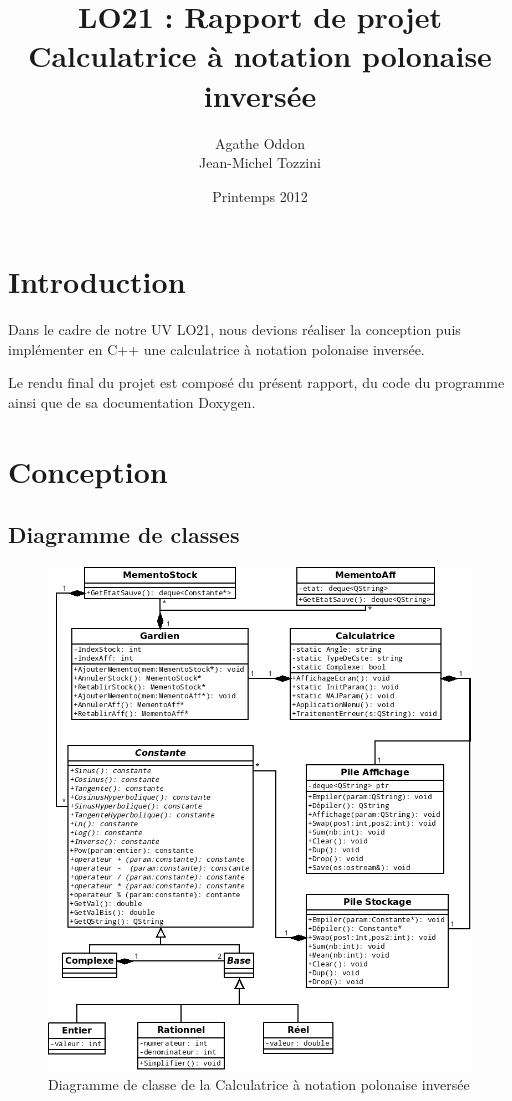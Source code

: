 \documentclass[a4paper,11pt]{article}
\begin{document}
\title{LO21 : Rapport de projet\\Calculatrice à notation polonaise inversée}
\author{Agathe Oddon\\Jean-Michel Tozzini}
\date{Printemps 2012}

\maketitle

\section*{Introduction}
Dans le cadre de notre UV LO21, nous devions réaliser la conception puis implémenter en C++ une calculatrice à notation polonaise inversée.

Le rendu final du projet est composé du présent rapport, du code du programme ainsi que de  sa documentation Doxygen.

\tableofcontents

\section{Conception}
\subsection{Diagramme de classes}
	\begin{figure}[H]
		\center
		\includegraphics[width=16.7cm]{UMLProjetLO21v3.png}
		\caption{Diagramme de classe de la Calculatrice à notation polonaise inversée}
	\end{figure}
\end{document}
